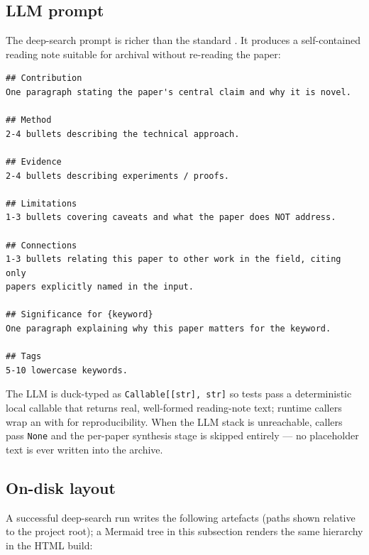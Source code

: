 \documentclass[
]{article}
\begin{document}
\subsection{LLM prompt}\label{llm-prompt}

The deep-search prompt is richer than the standard
. It produces a self-contained
reading note suitable for archival without re-reading the paper:

\begin{verbatim}
## Contribution
One paragraph stating the paper's central claim and why it is novel.

## Method
2-4 bullets describing the technical approach.

## Evidence
2-4 bullets describing experiments / proofs.

## Limitations
1-3 bullets covering caveats and what the paper does NOT address.

## Connections
1-3 bullets relating this paper to other work in the field, citing only
papers explicitly named in the input.

## Significance for {keyword}
One paragraph explaining why this paper matters for the keyword.

## Tags
5-10 lowercase keywords.
\end{verbatim}

The LLM is duck-typed as \texttt{Callable{[}{[}str{]},\ str{]}} so tests
pass a deterministic local callable that returns real, well-formed
reading-note text; runtime callers wrap an
 with
 for reproducibility. When the LLM
stack is unreachable, callers pass \texttt{None} and the per-paper
synthesis stage is skipped entirely --- no placeholder text is ever
written into the archive.

\subsection{On-disk layout}\label{on-disk-layout-1}

A successful deep-search run writes the following artefacts (paths shown
relative to the project root); a Mermaid tree in this subsection renders
the same hierarchy in the HTML build:
\end{document}
